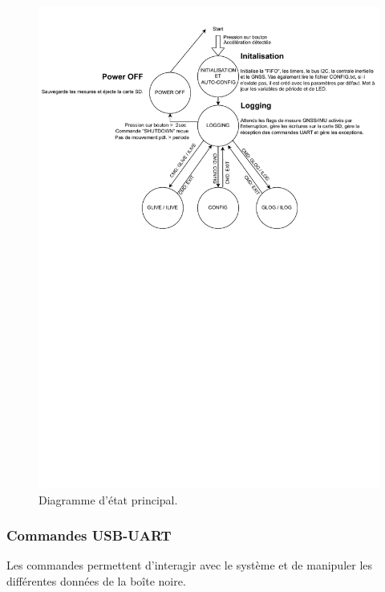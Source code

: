 \begin{figure}[h]
	\centering
	\includegraphics[width=1\linewidth]{../figures/code/diagrammes/state_app}
	\caption{Diagramme d'état principal.}
	\label{fig:stateapp}
\end{figure}

\subsubsection{Commandes USB-UART}
Les commandes permettent d'interagir avec le système et de manipuler les différentes données de la boîte noire.

